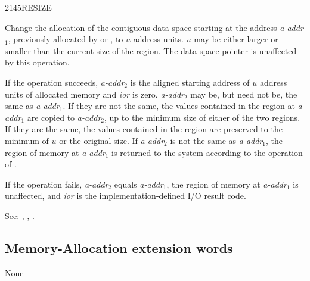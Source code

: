 \begin{newword}{2145}{RESIZE}

	Change the allocation of the contiguous data space starting at
	the address \emph{a-addr}$_1$, previously allocated by
	 or , to $u$ address units. $u$ may
	be either larger or smaller than the current size of the region.
	The data-space pointer is unaffected by this operation.

	If the operation succeeds, \emph{a-addr}$_2$ is the aligned
	starting address of $u$ address units of allocated memory and
	\emph{ior} is zero. \emph{a-addr}$_2$ may be, but need not be,
	the same as \emph{a-addr}$_1$. If they are not the same, the
	values contained in the region at \emph{a-addr}$_1$ are copied
	to \emph{a-addr}$_2$, up to the minimum size of either of the
	two regions. If they are the same, the values contained in the
	region are preserved to the minimum of $u$ or the original size.
	If \emph{a-addr}$_2$ is not the same as \emph{a-addr}$_1$, the
	region of memory at \emph{a-addr}$_1$ is returned to the system
	according to the operation of .

	If the operation fails, \emph{a-addr}$_2$ equals
	\emph{a-addr}$_1$, the region of memory at \emph{a-addr}$_1$ is
	unaffected, and \emph{ior} is the implementation-defined I/O
	result code.

\item[See:]
	,
	,
	.
\end{newword}


\subsection{Memory-Allocation extension words} %

None
